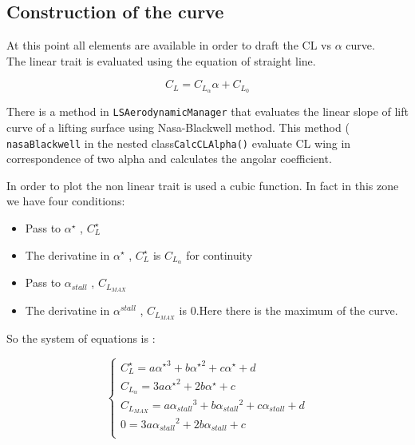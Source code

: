 \subsection{Construction of the curve}
At this point all elements are available in order to draft the CL vs $\alpha$ curve.\\ The linear trait is evaluated using the equation of straight line.

\begin{equation}
C_L= C_{L_\alpha} \alpha + C_{L_0}
\end{equation}

There is a method in \texttt{LSAerodynamicManager} that evaluates the linear slope of lift curve of a lifting surface using Nasa-Blackwell method. This method ( \texttt{nasaBlackwell} in the nested class\texttt{CalcCLAlpha()} evaluate CL wing in correspondence of two alpha and calculates the angolar coefficient.

In order to plot the non linear trait is used a cubic function. In fact in this zone we have four conditions:

\begin{itemize}
\item Pass to $\alpha^{\star}$ , $C_L^{\star}$
\item The derivatine in  $\alpha^{\star}$ , $C_L^{\star}$ is $C_{L_\alpha}$ for continuity
\item Pass to $\alpha_{stall}$ , $C_{L_{MAX}}$
\item The derivatine in  $\alpha^{stall}$ , $C_{L_{MAX}}$ is $0$.Here there is the maximum of the curve.
\end{itemize}

So the system of equations is :

\begin{equation}
\begin{cases}
 C_L^{\star} = a {\alpha^{\star}}^3 +  b {\alpha^{\star}}^2 +  c {\alpha^{\star}} + d \\
 C_{L_\alpha} = 3 a {\alpha^{\star}}^2 +  2b {\alpha^{\star}} +  c  \\ 
 C_{L_{MAX}} = a {\alpha_{stall}}^3 +  b {\alpha_{stall}}^2 +  c {\alpha_{stall}} + d \\
0 = 3 a {\alpha_{stall}}^2 +  2b {\alpha_{stall}} +  c  \\ 
  \end{cases}
\end{equation}




